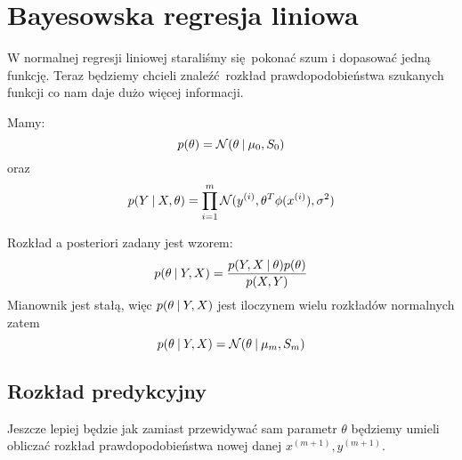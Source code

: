 \section{Bayesowska regresja liniowa}

W normalnej regresji liniowej staraliśmy się pokonać szum i dopasować jedną funkcję.
Teraz będziemy chcieli znaleźć rozkład prawdopodobieństwa szukanych funkcji co nam daje dużo więcej informacji.

Mamy:
\[
	p(\theta) = \operatorname{\mathcal{N}}(\theta \:\vert\: \mu_0, S_0)
\]
oraz
\[
	p(Y \:\vert\: X, \theta) = \prod_{i=1}^m \operatorname{\mathcal{N}}(y^{(i)}, \theta^T\phi(x^{(i)}), \sigma^2)
\]

Rozkład a posteriori zadany jest wzorem:
\[
	p(\theta \:\vert\: Y, X) = \frac{p(Y, X \:\vert\: \theta)p(\theta)}{p(X, Y)}
\]
Mianownik jest stałą, więc \( p(\theta \:\vert\: Y, X) \) jest iloczynem wielu rozkładów normalnych zatem
\[
	p(\theta \:\vert\: Y, X) = \operatorname{\mathcal{N}}(\theta \:\vert\: \mu_m, S_m)
\]

\subsection{Rozkład predykcyjny}

Jeszcze lepiej będzie jak zamiast przewidywać sam parametr \( \theta \) będziemy umieli obliczać rozkład prawdopodobieństwa nowej danej \( x^{(m+1)}, y^{(m+1)} \).